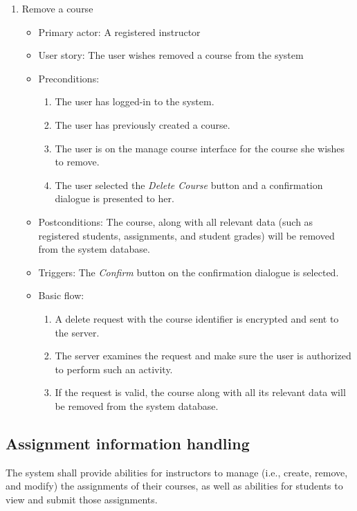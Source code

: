 \begin{enumerate}
\item Remove a course
\begin{itemize}
    \item Primary actor: A registered instructor
    \item User story: The user wishes removed a course from the system
    \item Preconditions:
        \begin{enumerate}
            \item The user has logged-in to the system.
            \item The user has previously created a course.
            \item The user is on the manage course interface for the course
                she wishes to remove.
            \item The user selected the \emph{Delete Course} button and a
                confirmation dialogue is presented to her.
        \end{enumerate}
    \item Postconditions:
        The course, along with all relevant data (such as registered students,
        assignments, and student grades) will be removed from the system
        database.
    \item Triggers: The \emph{Confirm} button on the confirmation dialogue is
        selected.
    \item Basic flow:
        \begin{enumerate}
            \item A delete request with the course identifier is encrypted
                and sent to the server.
            \item The server examines the request and make sure the user is
                authorized to perform such an activity.
            \item If the request is valid, the course along with all its
                relevant data will be removed from the system database.
        \end{enumerate}
\end{itemize}

\end{enumerate}

\subsection{Assignment information handling}
The system shall provide abilities for instructors to manage (i.e., create,
remove, and modify) the assignments of their courses, as well as abilities for
students to view and submit those assignments.

